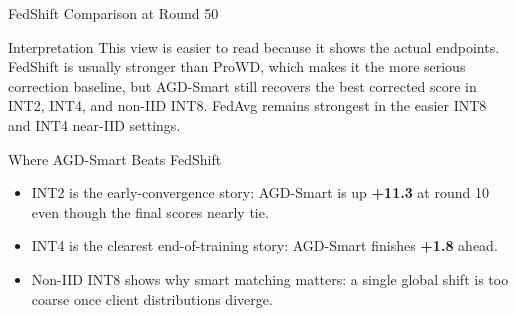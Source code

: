 \documentclass[aspectratio=169,11pt]{beamer}
\begin{document}
\begin{frame}{FedShift Comparison at Round 50}
\small
\begin{center}
\end{center}

\vspace{0.6em}
\begin{block}{Interpretation}
This view is easier to read because it shows the actual endpoints. FedShift is
usually stronger than ProWD, which makes it the more serious correction
baseline, but AGD-Smart still recovers the best corrected score in INT2, INT4,
and non-IID INT8. FedAvg remains strongest in the easier INT8 and INT4
near-IID settings.
\end{block}
\end{frame}

\begin{frame}{Where AGD-Smart Beats FedShift}
\begin{center}
\resizebox{0.92\linewidth}{!}{}
\end{center}

\vspace{0.3em}
\small
\begin{itemize}
  \item INT2 is the early-convergence story: AGD-Smart is up \textbf{+11.3} at round 10 even though the final scores nearly tie.
  \item INT4 is the clearest end-of-training story: AGD-Smart finishes \textbf{+1.8} ahead.
  \item Non-IID INT8 shows why smart matching matters: a single global shift is too coarse once client distributions diverge.
\end{itemize}
\end{frame}
\end{document}
